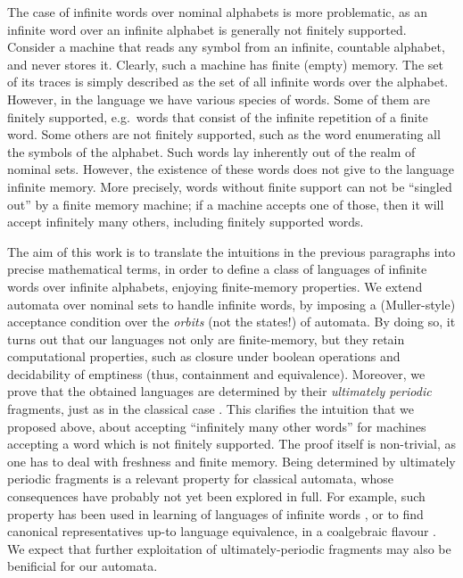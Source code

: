 The case of infinite words over nominal alphabets is more problematic, as an infinite word over an infinite alphabet is generally not finitely supported. Consider a machine that reads any symbol from an infinite, countable alphabet, and never stores it. Clearly, such a machine has finite (empty) memory. The set of its traces is simply described as the set of all infinite words over the alphabet. However, in the language we have various species of words. Some of them are finitely supported, e.g.\ words that consist of the infinite repetition of a finite word. Some others are not finitely supported, such as the word enumerating all the symbols of the alphabet. Such words lay inherently out of the realm of nominal sets. However, the existence of these words does not give to the language infinite memory. More precisely,  words without finite support can not be ``singled out'' by a finite memory machine; if a machine accepts one of those, then it will accept infinitely many others, including finitely supported words.  

The aim of this work is to translate the intuitions in the previous paragraphs into precise mathematical terms, in order to define a class of languages of infinite words over infinite alphabets, enjoying finite-memory properties. We extend automata over nominal sets to handle infinite words, by imposing a (Muller-style) acceptance condition 
over the \emph{orbits} (not the states!) of automata. By doing so, it turns out that our languages not only are finite-memory, but they retain computational properties, such as closure under boolean operations and decidability of emptiness (thus, containment and equivalence). Moreover, we prove that the obtained languages are determined by their \emph{ultimately periodic} fragments, just as in the classical case \cite{}. This clarifies the intuition that we proposed above, about accepting ``infinitely many other words'' for machines accepting a word which is not finitely supported. 
%
The proof itself is non-trivial, as one has to deal with freshness and finite memory.
Being determined by ultimately periodic fragments is
a relevant property for classical automata, whose consequences have probably not yet been explored in full.
%
For example, such property has been used in learning of languages of infinite words \cite{Emerson}, or to find canonical representatives up-to language equivalence, in a coalgebraic flavour \cite{CV12}. We expect that further exploitation of ultimately-periodic fragments may also be benificial for 
our automata.%



